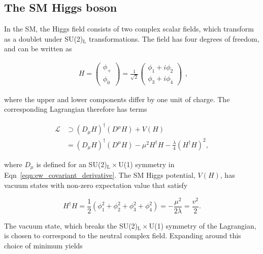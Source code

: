 \subsection{The SM Higgs boson}

In the SM, the Higgs field consists of two complex scalar fields, which transform as a doublet under SU(2)$_{\mathrm{L}}$ transformations. The field has four degrees of freedom, and can be written as

\begin{equation}
\begin{split}
    H =
    \begin{pmatrix}
    \phi_{+} \\
    \phi_{0}
    \end{pmatrix} 
    =  \frac{1}{\sqrt{2}} 
    \begin{pmatrix}
    \phi_{1} + i\phi_2 \\
    \phi_{3} + i\phi_4 
    \end{pmatrix} 
   \end{split},
\end{equation}

\noindent where the upper and lower components differ by one unit of charge. The corresponding Lagrangian therefore has terms

\begin{align}
\label{eqn:sm_higgs_lagrangian}
    \mathcal{L} & \supset (D_{\mu}H)^{\dagger}(D^{\mu}H) + V(H) \\
                &= (D_{\mu}H)^{\dagger}(D^{\mu}H) - \mu^{2}H^{\dagger}H - \frac{\lambda}{4}(H^{\dagger}H)^{2},
\end{align}

\noindent where $D_\mu$ is defined for an SU(2)$_{\mathrm{L}}\times$U(1) symmetry in Eqn~\ref{eqn:ew_covariant_derivative}. The SM Higgs potential, $V(H)$, has vacuum states with non-zero expectation value that satisfy

\begin{equation}
    H^{\dagger}H = \frac{1}{2}(\phi_{1}^{2} + \phi_{2}^{2} + \phi_{3}^{2} + \phi_{4}^{2}) = -\frac{\mu^{2}}{2\lambda} = \frac{v^{2}}{2}.
\end{equation}

\noindent The vacuum state, which breaks the SU(2)$_{\mathrm{L}}\times$U(1) symmetry of the Lagrangian, is chosen to correspond to the neutral complex field. Expanding around this choice of minimum yields 

